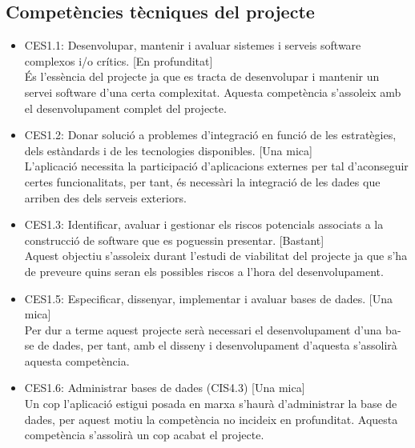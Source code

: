 \subsection{Competències tècniques del projecte}
\begin{itemize}
\item{}CES1.1: Desenvolupar, mantenir i avaluar sistemes i serveis software complexos i/o crítics. [En profunditat]\\
És l’essència del projecte ja que es tracta de desenvolupar i mantenir un servei software d’una certa complexitat. Aquesta competència s’assoleix amb el desenvolupament complet del projecte.
\item{}CES1.2: Donar solució a problemes d’integració en funció de les estratègies, dels estàndards i de les tecnologies disponibles. [Una mica]\\
L’aplicació necessita la participació d’aplicacions externes per tal  d’aconseguir certes funcionalitats, per tant, és necessàri la integració de les dades que arriben des dels serveis exteriors.
\item{}CES1.3: Identificar, avaluar i gestionar els riscos potencials associats a la construcció de software que es poguessin presentar. [Bastant]\\
Aquest objectiu s’assoleix durant l’estudi de viabilitat del projecte ja que s’ha de preveure quins seran els possibles riscos a l’hora del desenvolupament.
\item{}CES1.5: Especificar, dissenyar, implementar i avaluar bases de dades. [Una mica]\\
Per dur a terme aquest projecte serà necessari el desenvolupament d’una ba-
se de dades, per tant, amb el disseny i desenvolupament d’aquesta s’assolirà aquesta competència.
\item{}CES1.6: Administrar bases de dades (CIS4.3) [Una mica]\\
Un cop l’aplicació estigui posada en marxa s’haurà d’administrar la base de
dades, per aquest motiu la competència no incideix en profunditat. Aquesta
competència s’assolirà un cop acabat el projecte.


\end{itemize}

